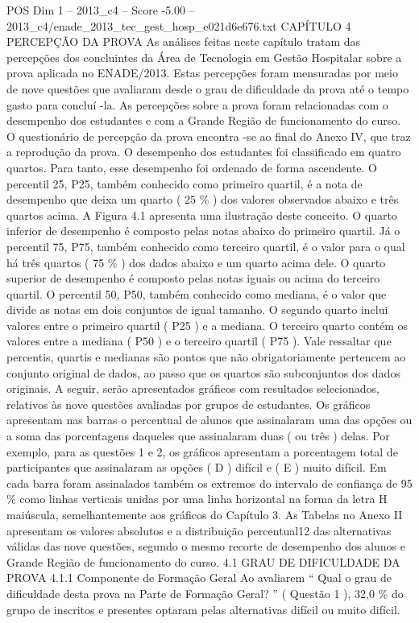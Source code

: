 \begin{textsample}{POS Dim 1 – 2013\_c4 – Score -5.00 – 2013\_c4/enade\_2013\_tec\_gest\_hosp\_e021d6e676.txt}  \label{ex:f1_pos_388}
CAPÍTULO 4 PERCEPÇÃO DA PROVA As análises feitas neste capítulo tratam das percepções dos concluintes da Área de Tecnologia em Gestão Hospitalar sobre a prova aplicada no ENADE/2013.
Estas percepções foram mensuradas por meio de nove questões que avaliaram desde o grau de dificuldade da prova até o tempo gasto para concluí -la.
As percepções sobre a prova foram relacionadas com o desempenho dos estudantes e com a Grande Região de funcionamento do curso.
O questionário de percepção da prova encontra -se ao final do Anexo IV, que traz a reprodução da prova.
O desempenho dos estudantes foi classificado em quatro quartos.
Para tanto, esse desempenho foi ordenado de forma ascendente.
O percentil 25, P25, também conhecido como primeiro quartil, é a nota de desempenho que deixa um quarto ( 25 \% ) dos valores observados abaixo e três quartos acima.
A Figura 4.1 apresenta uma ilustração deste conceito.
O quarto inferior de desempenho é composto pelas notas abaixo do primeiro quartil.
Já o percentil 75, P75, também conhecido como terceiro quartil, é o valor para o qual há três quartos ( 75 \% ) dos dados abaixo e um quarto acima dele.
O quarto superior de desempenho é composto pelas notas iguais ou acima do terceiro quartil.
O percentil 50, P50, também conhecido como mediana, é o valor que divide as notas em dois conjuntos de igual tamanho.
O segundo quarto inclui valores entre o primeiro quartil ( P25 ) e a mediana.
O terceiro quarto contém os valores entre a mediana ( P50 ) e o terceiro quartil ( P75 ).
Vale ressaltar que percentis, quartis e medianas são pontos que não obrigatoriamente pertencem ao conjunto original de dados, ao passo que os quartos são subconjuntos dos dados originais.
A seguir, serão apresentados gráficos com resultados selecionados, relativos às nove questões avaliadas por grupos de estudantes.
Os gráficos apresentam nas barras o percentual de alunos que assinalaram uma das opções ou a soma das porcentagens daqueles que assinalaram duas ( ou três ) delas.
Por exemplo, para as questões 1 e 2, os gráficos apresentam a porcentagem total de participantes que assinalaram as opções ( D ) difícil e ( E ) muito difícil.
Em cada barra foram assinalados também os extremos do intervalo de confiança de 95 \% como linhas verticais unidas por uma linha horizontal na forma da letra H maiúscula, semelhantemente aos gráficos do Capítulo 3.
As Tabelas no Anexo II apresentam os valores absolutos e a distribuição percentual12 das alternativas válidas das nove questões, segundo o mesmo recorte de desempenho dos alunos e Grande Região de funcionamento do curso. 4.1 GRAU DE DIFICULDADE DA PROVA 4.1.1 Componente de Formação Geral Ao avaliarem “ Qual o grau de dificuldade desta prova na Parte de Formação Geral? ” ( Questão 1 ), 32,0 \% do grupo de inscritos e presentes optaram pelas alternativas difícil ou muito difícil.

\end{textsample}

